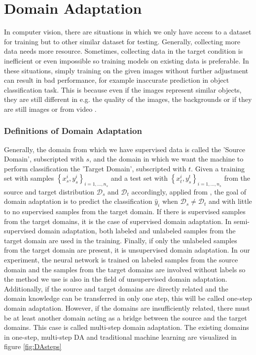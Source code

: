 \chapter{Domain Adaptation} \label{ch:domainAdaptation}
In computer vision, there are situations in which we only have access to a dataset for training but to other similar dataset for testing. Generally, collecting more data needs more resource. Sometimes, collecting data in the target condition is inefficient or even impossible so training models on existing data is preferable. In these situations, simply training on the given images without further adjustment can result in bad performance, for example inaccurate prediction in object classification task. This is because even if the images represent similar objects, they are still different in e.g. the quality of the images, the backgrounds or if they are still images or from video \cite{shiftImgVid}. 

\subsection*{Definitions of Domain Adaptation}
Generally, the domain from which we have supervised data is called the 'Source Domain', subscripted with $s$, and the domain in which we want the machine to perform classification the 'Target Domain', subscripted with $t$. Given a training set with samples $\left\{x_s^i, y_s^i\right\}_{i=1, ..., n_s}$ and a test set with  $\left\{x_t^i, y_s^t\right\}_{i=1, ..., n_s}$ from the source and target distribution $\mathcal{D}_s$ and $\mathcal{D}_t$ accordingly, applied from \cite{DAnetwork}, the goal of domain adaptation is to predict the classification $\hat{y}_i$ when $\mathcal{D}_s \neq \mathcal{D}_t$ and with little to no supervised samples from the target domain. If there is supervised samples from the target domains, it is the case of supervised domain adaptation. In semi-supervised domain adaptation, both labeled and unlabeled samples from the target domain are used in the training. Finally, if only the unlabeled samples from the target domain are present, it is unsupervised domain adaptation. In our experiment, the neural network is trained on labeled samples from the source domain and the samples from the target domains are involved without labels so the method we use is also in the field of unsupervised domain adaptation. Additionally, if the source and target domains are directly related and the domain knowledge can be transferred in only one step, this will be called one-step domain adaptation. However, if the domains are insufficiently related, there must be at least another domain acting as a bridge between the source and the target domains. This case is called multi-step domain adaptation. The existing domains in one-step, multi-step DA and traditional machine learning are visualized in figure \ref{fig:DAsteps}

